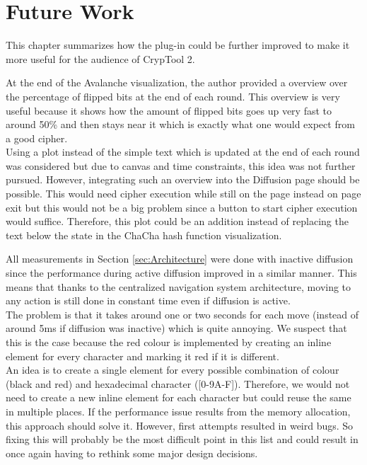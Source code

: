 
\chapter{Future Work}
\label{chap:futureWork}

This chapter summarizes how the plug-in could be further improved to make it more useful for the audience of CrypTool 2.

\begin{description}[style=nextline]

\item[Better overview over flipped bits at the end of each round]

At the end of the Avalanche visualization, the author provided a overview over the percentage of flipped bits at the end of each round. This overview is very useful because it shows how the amount of flipped bits goes up very fast to around 50\% and then stays near it which is exactly what one would expect from a good cipher. \\
Using a plot instead of the simple text which is updated at the end of each round was considered but due to canvas and time constraints, this idea was not further pursued. However, integrating such an overview into the Diffusion page should be possible. This would need cipher execution while still on the page instead on page exit but this would not be a big problem since a button to start cipher execution would suffice. Therefore, this plot could be an addition instead of replacing the text below the state in the ChaCha hash function visualization.

\item[Improve performance during diffusion]

All measurements in Section \ref{sec:Architecture} were done with inactive diffusion since the performance during active diffusion improved in a similar manner. This means that thanks to the centralized navigation system architecture, moving to any action is still done in constant time even if diffusion is active. \\
The problem is that it takes around one or two seconds for each move (instead of around 5ms if diffusion was inactive) which is quite annoying. We suspect that this is the case because the red colour is implemented by creating an inline element for every character and marking it red if it is different. \\
An idea is to create a single element for every possible combination of colour (black and red) and hexadecimal character ([0-9A-F]). Therefore, we would not need to create a new inline element for each character but could reuse the same in multiple places. If the performance issue results from the memory allocation, this approach should solve it. However, first attempts resulted in weird bugs. So fixing this will probably be the most difficult point in this list and could result in once again having to rethink some major design decisions.


\end{description}
